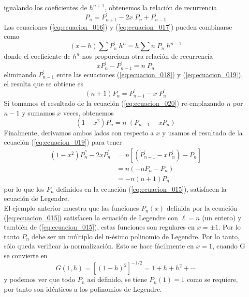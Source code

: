 igualando los coeficientes de $h^{n+1}$, obtenemos la relación de recurrencia
\begin{equation}
P_{n} = P^{\prime}_{n+1} - 2x \; P^{\prime}_{n} + P^{\prime}_{n-1}
\label{eq:ecuacion_018}
\end{equation}
Las ecuaciones (\ref{eq:ecuacion_016}) y (\ref{eq:ecuacion_017}) pueden combinarse como
\[ (x-h) \sum P^{\prime}_{n} \; h^{n} = h \sum n \; P_{n} \; h^{n-1} \]
donde el coeficiente de $h^{n}$ nos proporciona otra relación de recurrencia
\begin{equation}
x P^{\prime}_{n} - P^{\prime}_{n-1} =  n \; P_{n}
\label{eq:ecuacion_019}
\end{equation}
eliminando $P^{\prime}_{n-1}$ entre las ecuaciones (\ref{eq:ecuacion_018}) y (\ref{eq:ecuacion_019}), el resulta que se obtiene es
\begin{equation}
(n+1)P_{n} = P^{\prime}_{n+1} - x \; P^{\prime}_{n}
\label{eq:ecuacion_020}
\end{equation}
Si tomamos el resultado de la ecuación (\ref{eq:ecuacion_020}) re-emplazando $n$ por $n-1$ y sumamos $x$ veces, obtenemos
\begin{equation}
(1 - x^{2}) P^{\prime}_{n} = n \; (P_{n-1} - x P_{n})
\label{eq:ecuacion_021}
\end{equation}
Finalmente, derivamos ambos lados con respecto a $x$ y usamos el resultado de la ecuación (\ref{eq:ecuacion_019}) para tener
\[ \begin{split}
(1-x^{2}) P^{\prime \prime}_{n} - 2x P^{\prime}_{n} &=  n [ (P^{\prime}_{n-1} - x P^{\prime}_{n}) - P_{n} ] \\
&= n (-n P_{n} - P_{n}) \\
&= -n (n+1) P_{n}
\end{split} \]
por lo que los $P_{n}$ definidos en la ecuación (\ref{eq:ecuacion_015}), satisfacen la ecuación de Legendre.
\\
El ejemplo anterior muestra que las funciones $P_{n} (x)$ definida por la ecuación (\ref{eq:ecuacion_015}) satisfacen la ecuación de Legendre con $\ell = n$ (un entero) y también de (\ref{eq:ecuacion_015}), estas funciones son regulares en $x = \pm 1$. Por lo tanto $P_{n}$ debe ser un múltiplo del n-ésimo polinomio de Legendre. Por lo tanto, sólo queda verificar la normalización. Esto se hace fácilmente en $x = 1$, cuando G se convierte en
\[ G(1,h) = [(1 - h)^{2}]^{-1/2} =  1 + h + h^{2} + \cdots \]
y podemos ver que todo $P_{n}$ así definido, se tiene $P_{n} (1) = 1$ como se requiere, por tanto son idénticos a los polinomios de Legendre.
